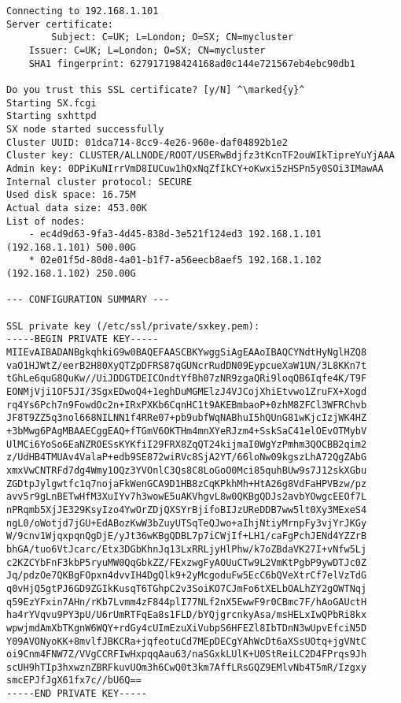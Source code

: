 \begin{lstlisting}
Connecting to 192.168.1.101
Server certificate:
        Subject: C=UK; L=London; O=SX; CN=mycluster
	Issuer: C=UK; L=London; O=SX; CN=mycluster
	SHA1 fingerprint: 627917198424168ad0c144e721567eb4ebc90db1

Do you trust this SSL certificate? [y/N] ^\marked{y}^
Starting SX.fcgi
Starting sxhttpd
SX node started successfully
Cluster UUID: 01dca714-8cc9-4e26-960e-daf04892b1e2
Cluster key: CLUSTER/ALLNODE/ROOT/USERwBdjfz3tKcnTF2ouWIkTipreYuYjAAA
Admin key: 0DPiKuNIrrVmD8IUCuw1hQxNqZfIkCY+oKwxi5zHSPn5y0SOi3IMawAA
Internal cluster protocol: SECURE
Used disk space: 16.75M
Actual data size: 453.00K
List of nodes:
    - ec4d9d63-9fa3-4d45-838d-3e521f124ed3 192.168.1.101 (192.168.1.101) 500.00G
    * 02e01f5d-80d8-4a01-b1f7-a56eecb8aef5 192.168.1.102 (192.168.1.102) 250.00G

--- CONFIGURATION SUMMARY ---

SSL private key (/etc/ssl/private/sxkey.pem):
-----BEGIN PRIVATE KEY-----
MIIEvAIBADANBgkqhkiG9w0BAQEFAASCBKYwggSiAgEAAoIBAQCYNdtHyNglHZQ8
vaO1HJWtZ/eerB2H80XyQTZpDFRS87qGUNcrRudDN09EypcueXaW1UN/3L8KKn7t
tGhLe6quG8QuKw//UiJDDGTDEICOndtYfBh07zNR9zgaQRi9loqQB6Iqfe4K/T9F
EONMjVji1OF5JI/3SgxEDwoQ4+1eghDuMGMElzJ4VJCojXhiEtvwo1ZruFX+Xogd
rq4Ys6Pch7n9FowdOc2n+IRxPXKb6CqnHC1t9AKEBmbaoP+0zhM8ZFCl3WFRChvb
JF8T9ZZ5q3nol668NILNN1f4RRe07+pb9ubfWqNABhuI5hQUnG81wKjcIzjWK4HZ
+3bMwg6PAgMBAAECggEAQ+fTGmV6OKTHm4mnXYeRJzm4+SskSaC41elOEvOTMybV
UlMCi6YoSo6EaNZROESsKYKfiI29FRX8ZqQT24kijmaI0WgYzPmhm3QOCBB2qim2
z/UdHB4TMUAv4ValaP+edb9SE872wiRVc8SjA2YT/66loNw09kgszLhA72QgZAbG
xmxVwCNTRFd7dg4Wmy1OQz3YVOnlC3Qs8C8LoGoO0Mci85quhBUw9s7J12skXGbu
ZGDtpJylgwtfc1q7nojaFkWenGCA9D1HB8zCqKPkhMh+HtA26g8VdFaHPVBzw/pz
avv5r9gLnBETwHfM3XuIYv7h3wowE5uAKVhgvL8w0QKBgQDJs2avbYOwgcEEOf7L
nPRqmb5XjJE329KsyIzo4YwOrZDjQXSYrBjifoBIJzUReDDB7ww5lt0Xy3MExeS4
ngL0/oWotjd7jGU+EdABozKwW3bZuyUTSqTeQJwo+aIhjNtiyMrnpFy3vjYrJKGy
W/9cnv1WjqxpqnQgDjE/yJt36wKBgQDBL7p7iCWjIf+LH1/caFgPchJENd4YZZrB
bhGA/tuo6VtJcarc/Etx3DGbKhnJq13LxRRLjyHlPhw/k7oZBdaVK27I+vNfw5Lj
c2KZCYbFnF3kbP5ryuMW0QqGbkZZ/FExzwgFyAOUuCTw9L2VmKtPgbP9ywDTJc0Z
Jq/pdzOe7QKBgFOpxn4dvvIH4DgQlk9+2yMcgoduFw5EcC6bQVeXtrCf7elVzTdG
q0vHjQ5gtPJ6GD9ZGIkKusqT6TGhpC2v3SoiKO7CJmFo6tXELbOALhZY2gOWTNqj
q59EzYFxin7AHn/rKb7Lvmm4zF844plI77NLf2nX5EwwF9r0CBmc7F/hAoGAUctH
ha4rYVqvu9PY3pU/U6rUmRTFqEa8s1FLD/bYQjgrcnkyAsa/msHELxIwQPbRi8kx
wpwjmdAmXbTKgnW6WQY+rdGy4cUImEzuXiVubpS6HFEZl8IbTDnN3wUpvEfciN5D
Y09AVONyoKK+8mvlfJBKCRa+jqfeotuCd7MEpDECgYAhWcDt6aXSsUOtq+jgVNtC
oi9Cnm4FNW7Z/VVgCCRFIwHxpqqAau63/naSGxkLUlK+U0StReiLC2D4FPrqs9Jh
scUH9hTIp3hxwznZBRFkuvUOm3h6CwQ0t3km7AffLRsGQZ9EMlvNb4T5mR/Izgxy
smcEPJfJgX61fx7c//bU6Q==
-----END PRIVATE KEY-----



\end{lstlisting}
